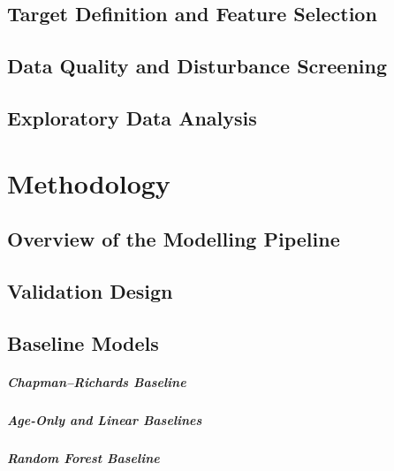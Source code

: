 \documentclass[logo,msc]{Original/infthesis}           %
\begin{document}
\section{Target Definition and Feature Selection}

\section{Data Quality and Disturbance Screening}

\section{Exploratory Data Analysis}

\chapter{Methodology}

\section{Overview of the Modelling Pipeline}

\section{Validation Design}

\section{Baseline Models}

\paragraph{Chapman--Richards Baseline}

\paragraph{Age-Only and Linear Baselines}

\paragraph{Random Forest Baseline}
\end{document}
